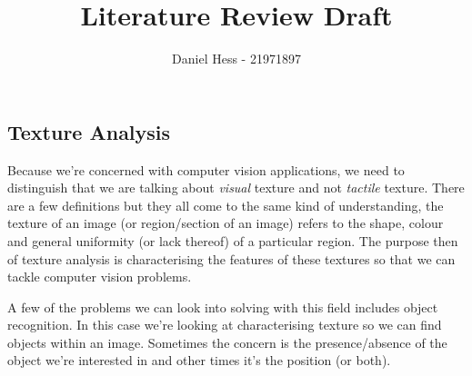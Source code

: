 \documentclass[a4]{article}
\title{Literature Review Draft}
\author{Daniel Hess - 21971897}
\date{}
\begin{document}
\maketitle

\subsection*{Texture Analysis}
Because we're concerned with computer vision applications, we need to distinguish that we are talking about \textit{visual} texture and not \textit{tactile} texture. There are a few definitions but they all come to the same kind of understanding, the texture of an image (or region/section of an image) refers to the shape, colour and general uniformity (or lack thereof) of a particular region. The purpose then of texture analysis is characterising the features of these textures so that we can tackle computer vision problems.

A few of the problems we can look into solving with this field includes object recognition. In this case we're looking at characterising texture so we can find objects within an image. Sometimes the concern is the presence/absence of the object we're interested in and other times it's the position (or both). 
\end{document}
